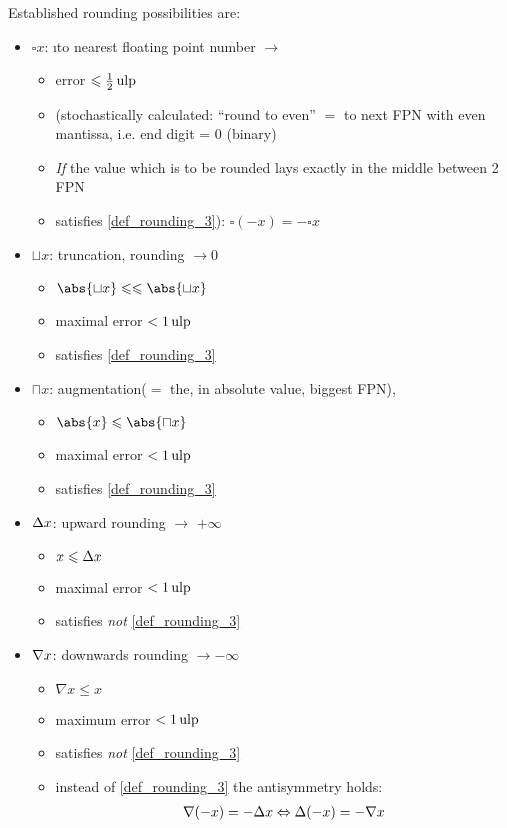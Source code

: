 	\begin{example}
		Established rounding possibilities are:
		\begin{itemize}
			\item $\square x$: \i to nearest floating point number $\to$
			\begin{itemize}
				\item error $\leqslant \frac{1}{2}\operatorname{ulp}$
				\item (stochastically calculated: ``round to even'' $=$ to next FPN with even mantissa, i.e. end digit = 0 (binary)
				\item \emph{If} the value which is to be rounded lays exactly in the middle between 2 FPN
				\item satisfies \ref{def_rounding_3}): $\square (-x)=-\square x$
			\end{itemize}
		
			\item $\sqcup x$: truncation, rounding $\to 0$
			\begin{itemize}
				\item $\abs{\sqcup x} \le \le\abs{\sqcup x}$
				\item maximal error $< 1 \operatorname{ulp}$
				\item satisfies \ref{def_rounding_3}
			\end{itemize}
			\item $\sqcap x$: augmentation($=$ the, in absolute value, biggest FPN), 
			\begin{itemize}
				\item $\abs{x} \le \abs{\sqcap x}$
				\item maximal error $<1 \operatorname{ulp}$
				\item satisfies \ref{def_rounding_3}
			\end{itemize}
			\item $\Delta x$: upward rounding $\to$ $+\infty$
			\begin{itemize}
				\item $x \leqslant \Delta x$
				\item maximal error $< 1 \operatorname{ulp}$
				\item satisfies \emph{not} \ref{def_rounding_3} 
			\end{itemize}
			\item $\nabla x$: downwards rounding $\to -\infty$
			\begin{itemize}
				\item $\nabla x\le x$
				\item maximum error $< 1 \operatorname{ulp}$
				\item satisfies \emph{not} \ref{def_rounding_3}
				\item instead of \ref{def_rounding_3} the antisymmetry holds:
				\begin{align*}
					\nabla(-x)=-\Delta x \Leftrightarrow \Delta(-x) = - \nabla x
				\end{align*}
			\end{itemize}
		\end{itemize}
	\end{example}
